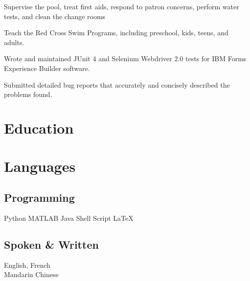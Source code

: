 \documentclass[]{deedy-resume-openfont}
\begin{document}
\begin{tightemize}
\item Supervise the pool, treat first aids, respond to patron concerns, perform water tests, and clean the change rooms
\item Teach the Red Cross Swim Programs, including preschool, kids, teens, and adults.
\end{tightemize}
\sectionsep

\begin{tightemize}
\item Wrote and maintained JUnit 4 and Selenium Webdriver 2.0 tests for IBM Forms Experience Builder software.
\item Submitted detailed bug reports that accurately and concisely described the problems found.
\end{tightemize}
\sectionsep


\section{Education}
\sectionsep

\section{Languages}
\begin{minipage}[t]{.6\textwidth}
\subsection{Programming}
Python \textbullet{} MATLAB \textbullet{} Java \textbullet{} Shell Script \textbullet{} \LaTeX \textbullet{}
\end{minipage}
\hfill
\begin{minipage}[t]{.35\textwidth}
\subsection{Spoken \& Written}
 English, French \\
 Mandarin Chinese\\
\end{minipage}
\end{document}
